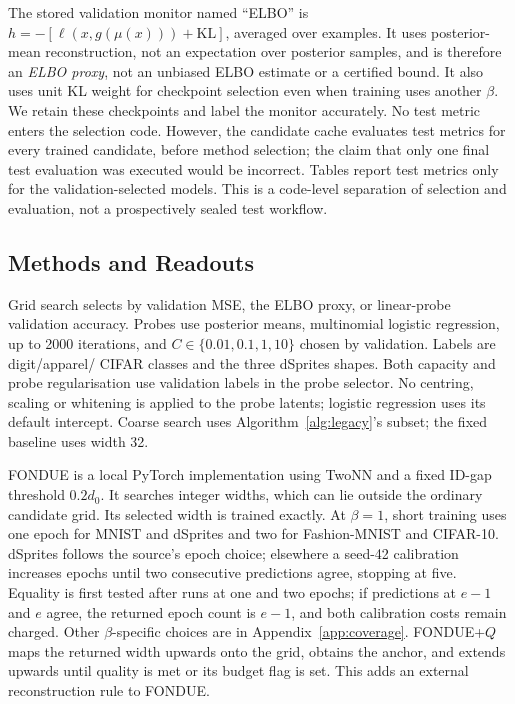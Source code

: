 The stored validation monitor named ``ELBO'' is
$h=-[\ell(x,g(\mu(x)))+\mathrm{KL}]$, averaged over examples. It uses
posterior-mean reconstruction, not an expectation over posterior samples,
and is therefore an \emph{ELBO proxy}, not an unbiased ELBO estimate or a
certified bound. It also uses unit KL weight for checkpoint selection
even when training uses another $\beta$. We retain these checkpoints and
label the monitor accurately. No test metric enters the selection code.
However, the candidate cache evaluates test metrics for every trained
candidate, before method selection; the claim that only one final test
evaluation was executed would be incorrect. Tables report test metrics
only for the validation-selected models. This is a code-level separation
of selection and evaluation, not a prospectively sealed test workflow.

\subsection{Methods and Readouts}\label{sec:methods}
Grid search selects by validation MSE, the ELBO proxy, or linear-probe
validation accuracy. Probes use posterior means, multinomial logistic
regression, up to 2000 iterations, and
$C\in\{0.01,0.1,1,10\}$ chosen by validation. Labels are digit/apparel/
CIFAR classes and the three dSprites shapes. Both capacity and probe
regularisation use validation labels in the probe selector. No centring,
scaling or whitening is applied to the probe latents; logistic regression
uses its default intercept. Coarse search
uses Algorithm~\ref{alg:legacy}'s subset; the fixed baseline uses width 32.

FONDUE is a local PyTorch implementation using TwoNN and a fixed
ID-gap threshold $0.2d_0$. It searches integer widths, which can lie
outside the ordinary candidate grid. Its selected width is trained
exactly. At $\beta=1$, short training uses one epoch for MNIST and
dSprites and two for Fashion-MNIST and CIFAR-10. dSprites follows the
source's epoch choice; elsewhere a seed-42 calibration increases epochs
until two consecutive predictions agree, stopping at five. Equality is
first tested after runs at one and two epochs; if predictions at $e-1$
and $e$ agree, the returned epoch count is $e-1$, and both calibration
costs remain charged. Other
$\beta$-specific choices are in Appendix~\ref{app:coverage}.
FONDUE+$Q$ maps the returned width upwards onto the grid, obtains the
anchor, and extends upwards until quality is met or its budget flag is
set. This adds an external reconstruction rule to FONDUE.

